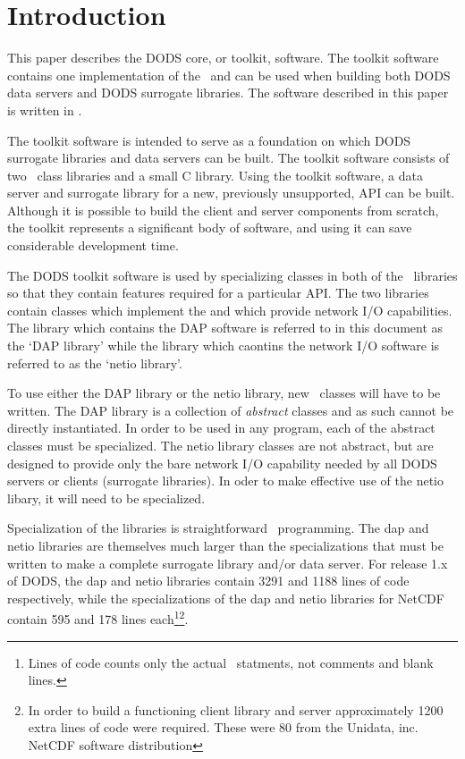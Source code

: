 \section{Introduction} 
\label{introduction}

This paper describes the DODS core, or toolkit, software. The toolkit
software contains one implementation of the \Dap\ and can be used when
building both DODS data servers and DODS surrogate libraries. The software
described in this paper is written in \Cpp.

The toolkit software is intended to serve as a foundation on which DODS
surrogate libraries and data servers can be built. The toolkit software
consists of two \Cpp\ class libraries and a small C library. Using the
toolkit software, a data server and surrogate library for a new, previously
unsupported, API can be built.  Although it is possible to build the client
and server components from scratch, the toolkit represents a significant body
of software, and using it can save considerable development time.

The DODS toolkit software is used by specializing classes in both of the \Cpp\
libraries so that they contain features required for a particular API. The
two libraries contain classes which implement the \dap and which provide
network I/O capabilities. The library which contains the DAP software is
referred to in this document as the `DAP library' while the library which
caontins the network I/O software is referred to as the `netio library'. 

To use either the DAP library or the netio library, new \Cpp\ classes will
have to be written. The DAP library is a collection of {\em abstract\/}
classes\cite{stroustrup:cpp} and as such cannot be directly instantiated. In
order to be used in any program, each of the abstract classes must be
specialized. The netio library classes are not abstract, but are designed to
provide only the bare network I/O capability needed by all DODS servers or
clients (surrogate libraries). In oder to make effective use of the netio
libary, it will need to be specialized. 

Specialization of the libraries is straightforward \Cpp\ programming. The dap
and netio libraries are themselves much larger than the specializations that
must be written to make a complete surrogate library and/or data server. For
release 1.x of DODS, the dap and netio libraries contain 3291 and 1188 lines
of code respectively, while the specializations of the dap and netio
libraries for NetCDF contain 595 and 178 lines each\footnote{Lines of
code counts only the actual \Cpp\ statments, not comments and blank
lines.}\footnote{In order to build a functioning client library and server
approximately 1200 extra lines of code were required. These were 80%
from the Unidata, inc. NetCDF software distribution}.


